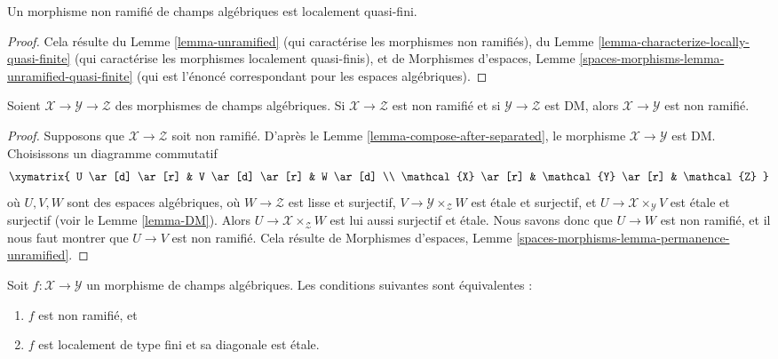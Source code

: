 \begin{lemma}
\label{lemma-unramified-quasi-finite}
Un morphisme non ramifi\'e de champs alg\'ebriques est localement quasi-fini.
\end{lemma}

\begin{proof}
Cela r\'esulte du
Lemme \ref{lemma-unramified} (qui caract\'erise les morphismes non ramifi\'es),
du Lemme \ref{lemma-characterize-locally-quasi-finite} (qui caract\'erise
les morphismes localement quasi-finis), et de
Morphismes d'espaces, Lemme \ref{spaces-morphisms-lemma-unramified-quasi-finite}
(qui est l'\'enonc\'e correspondant pour les espaces alg\'ebriques).
\end{proof}

\begin{lemma}
\label{lemma-permanence-unramified}
Soient $\mathcal{X} \to \mathcal{Y} \to \mathcal{Z}$ des
morphismes de champs alg\'ebriques.
Si $\mathcal{X} \to \mathcal{Z}$ est non ramifi\'e et si
$\mathcal{Y} \to \mathcal{Z}$ est DM, alors
$\mathcal{X} \to \mathcal{Y}$ est non ramifi\'e.
\end{lemma}

\begin{proof}
Supposons que $\mathcal{X} \to \mathcal{Z}$ soit non ramifi\'e. D'apr\`es le
Lemme \ref{lemma-compose-after-separated}, le morphisme
$\mathcal{X} \to \mathcal{Y}$ est DM. Choisissons un diagramme commutatif
$$
\xymatrix{
U \ar[d] \ar[r] & V \ar[d] \ar[r] & W \ar[d] \\
\mathcal{X} \ar[r] & \mathcal{Y} \ar[r] & \mathcal{Z}
}
$$
o\`u $U, V, W$ sont des espaces alg\'ebriques,
o\`u $W \to \mathcal{Z}$ est lisse et surjectif,
$V \to \mathcal{Y} \times_\mathcal{Z} W$ est \'etale et surjectif, et
$U \to \mathcal{X} \times_\mathcal{Y} V$ est \'etale et surjectif
(voir le Lemme \ref{lemma-DM}). Alors
$U \to \mathcal{X} \times_\mathcal{Z} W$ est lui aussi surjectif et \'etale.
Nous savons donc que $U \to W$ est non ramifi\'e, et il nous faut montrer que
$U \to V$ est non ramifi\'e. Cela r\'esulte de
Morphismes d'espaces, Lemme \ref{spaces-morphisms-lemma-permanence-unramified}.
\end{proof}

\begin{lemma}
\label{lemma-characterize-unramified}
Soit $f : \mathcal{X} \to \mathcal{Y}$ un morphisme de champs alg\'ebriques.
Les conditions suivantes sont \'equivalentes :
\begin{enumerate}
\item $f$ est non ramifi\'e, et
\item $f$ est localement de type fini et sa diagonale est \'etale.
\end{enumerate}
\end{lemma}

